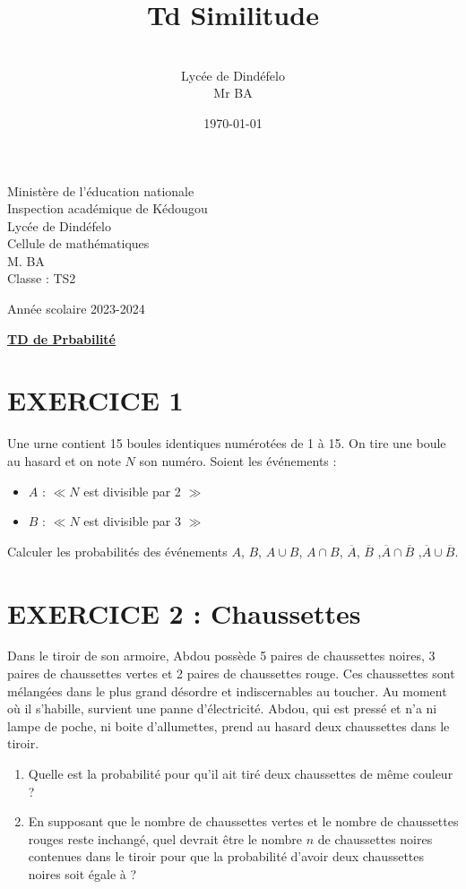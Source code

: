 \documentclass[12pt]{article}
\author{\\Lycée de Dindéfelo\\Mr BA}
\title{\textbf{Td Similitude}}
\date{\today}
\begin{document}
\begin{minipage}{0.5\textwidth}
	Ministère de l'éducation nationale  \\
	Inspection académique de Kédougou   \\
	Lycée de Dindéfelo            \\
	Cellule de mathématiques            \\
	M. BA                          \\
	Classe : TS2  \\
\end{minipage}
\begin{minipage}{0.5\textwidth}
	Année scolaire 2023-2024 \\
\end{minipage}

\begin{center}
	\textbf{{\underline{TD de Prbabilité}}}
\end{center}
\section*{EXERCICE 1}
Une urne contient 15 boules identiques numérotées de 1 à 15. On tire une boule au hasard et on note $N$ son numéro. Soient les événements :
\begin{itemize}
   \item $A$ : $\ll N$ est divisible par 2 $\gg$
   \item $B$ : $\ll N$ est divisible par 3 $\gg$
\end{itemize}
Calculer les probabilités des événements $A$, $B$, $A \cup B$, $A \cap B$, $\overline{A}$, $\overline{B}$ ,$\overline{A} \cap \overline{B}$ ,$\overline{A} \cup \overline{B}$.

\section*{EXERCICE 2 : Chaussettes}
Dans le tiroir de son armoire, Abdou possède 5 paires de chaussettes noires, 3 paires de chaussettes vertes et 2 paires de chaussettes rouge. Ces chaussettes sont mélangées dans le plus grand désordre et indiscernables au toucher.
Au moment où il s’habille, survient une panne d’électricité. Abdou, qui est pressé et n’a ni lampe de poche, ni boite d’allumettes, prend au hasard deux chaussettes dans le tiroir.
\begin{enumerate}
    \item Quelle est la probabilité pour qu’il ait tiré deux chaussettes de même couleur ?
    \item En supposant que le nombre de chaussettes vertes et le nombre de chaussettes rouges reste inchangé, quel devrait être le nombre $n$ de chaussettes noires contenues dans le tiroir pour que la probabilité d’avoir deux chaussettes noires soit égale à ?
\end{enumerate}
\end{document}

